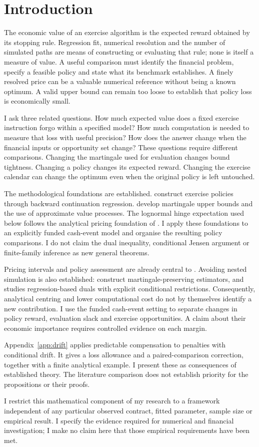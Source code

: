 \section{Introduction}

The economic value of an exercise algorithm is the expected reward obtained by its stopping rule. Regression fit, numerical resolution and the number of simulated paths are means of constructing or evaluating that rule; none is itself a measure of value. A useful comparison must identify the financial problem, specify a feasible policy and state what its benchmark establishes. A finely resolved price can be a valuable numerical reference without being a known optimum. A valid upper bound can remain too loose to establish that policy loss is economically small.

I ask three related questions. How much expected value does a fixed exercise instruction forgo within a specified model? How much computation is needed to measure that loss with useful precision? How does the answer change when the financial inputs or opportunity set change? These questions require different comparisons. Changing the martingale used for evaluation changes bound tightness. Changing a policy changes its expected reward. Changing the exercise calendar can change the optimum even when the original policy is left untouched.

The methodological foundations are established. \citet{longstaff2001} construct exercise policies through backward continuation regression. \citet{haugh2004} develop martingale upper bounds and the use of approximate value processes. The lognormal hinge expectation used below follows the analytical pricing foundation of \citet{black1973}. I apply these foundations to an explicitly funded cash-event model and organise the resulting policy comparisons. I do not claim the dual inequality, conditional Jensen argument or finite-family inference as new general theorems.

Pricing intervals and policy assessment are already central to \citet{andersen2004}. Avoiding nested simulation is also established: \citet{belomestny2009} construct martingale-preserving estimators, and \citet{cline2026} studies regression-based duals with explicit conditional restrictions. Consequently, analytical centring and lower computational cost do not by themselves identify a new contribution. I use the funded cash-event setting to separate changes in policy reward, evaluation slack and exercise opportunities. A claim about their economic importance requires controlled evidence on each margin.

Appendix~\ref{app:drift} applies predictable compensation to penalties with conditional drift. It gives a loss allowance and a paired-comparison correction, together with a finite analytical example. I present these as consequences of established theory. The literature comparison does not establish priority for the propositions or their proofs.

I restrict this mathematical component of my research to a framework independent of any particular observed contract, fitted parameter, sample size or empirical result. I specify the evidence required for numerical and financial investigation; I make no claim here that those empirical requirements have been met.
